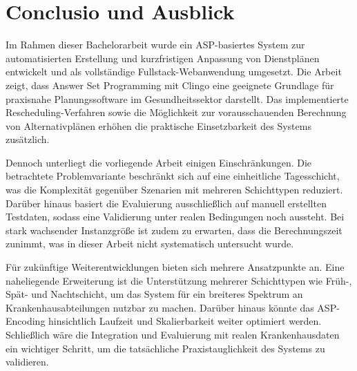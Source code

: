 
\chapter{Conclusio und Ausblick}

Im Rahmen dieser Bachelorarbeit wurde ein ASP-basiertes System zur automatisierten Erstellung und kurzfristigen Anpassung von Dienstplänen entwickelt und als vollständige Fullstack-Webanwendung umgesetzt. Die Arbeit zeigt, dass Answer Set Programming mit Clingo eine geeignete Grundlage für praxisnahe Planungssoftware im Gesundheitssektor darstellt. Das implementierte Rescheduling-Verfahren sowie die Möglichkeit zur vorausschauenden Berechnung von Alternativplänen erhöhen die praktische Einsetzbarkeit des Systems zusätzlich.

Dennoch unterliegt die vorliegende Arbeit einigen Einschränkungen. Die betrachtete Problemvariante beschränkt sich auf eine einheitliche Tagesschicht, was die Komplexität gegenüber Szenarien mit mehreren Schichttypen reduziert. Darüber hinaus basiert die Evaluierung ausschließlich auf manuell erstellten Testdaten, sodass eine Validierung unter realen Bedingungen noch aussteht. Bei stark wachsender Instanzgröße ist zudem zu erwarten, dass die Berechnungszeit zunimmt, was in dieser Arbeit nicht systematisch untersucht wurde.

Für zukünftige Weiterentwicklungen bieten sich mehrere Ansatzpunkte an. Eine naheliegende Erweiterung ist die Unterstützung mehrerer Schichttypen wie Früh-, Spät- und Nachtschicht, um das System für ein breiteres Spektrum an Krankenhausabteilungen nutzbar zu machen. Darüber hinaus könnte das ASP-Encoding hinsichtlich Laufzeit und Skalierbarkeit weiter optimiert werden. Schließlich wäre die Integration und Evaluierung mit realen Krankenhausdaten ein wichtiger Schritt, um die tatsächliche Praxistauglichkeit des Systems zu validieren.




